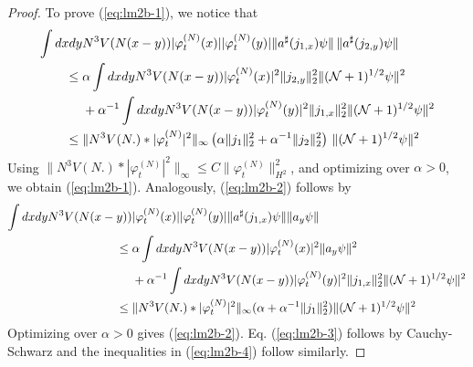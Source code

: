 \documentclass[11pt,a4paper,DIV11]{scrartcl}	%
\newcommand{\cN}{{\cal N}}
\begin{document}
\begin{proof}
To prove (\ref{eq:lm2b-1}), we notice that
\[ \begin{split} 
\int dx dy &N^3 V(N (x-y)) |\varphi_t^{(N)} (x)| |\varphi_t^{(N)} (y)|  \| a^\sharp (j_{1,x}) \psi \| \, \| a^\sharp (j_{2,y}) \psi \| \\ \leq \; & \alpha \int dx dy N^3 V(N (x-y)) |\varphi^{(N)}_t (x)|^2 \| j_{2,y} \|_2^2 \| (\cN+1)^{1/2} \psi \|^2 \\ &+ \alpha^{-1}
 \int dx dy N^3 V(N (x-y)) |\varphi^{(N)}_t (y)|^2 \| j_{1,x} \|_2^2 \| (\cN+1)^{1/2} \psi \|^2 \\
 \leq \; & \| N^3 V(N.) * |\varphi_t^{(N)}|^2 \|_\infty  \left( \alpha \| j_{1} \|^2_2 + \alpha^{-1}
 \| j_2 \|_{2}^2 \right) \, \| (\cN+1)^{1/2} \psi \|^2
 \end{split} \]
 Using $\| N^3 V(N.) * |\varphi_t^{(N)}|^2 \|_\infty \leq C \| \varphi_t^{(N)} \|_{H^2}^2$, and optimizing over $\alpha >0$, we obtain (\ref{eq:lm2b-1}). Analogously, (\ref{eq:lm2b-2}) follows by
\[ \begin{split} 
\int dx dy N^3 V(N (x-y)) &|\varphi^{(N)}_t (x)| |\varphi^{(N)}_t (y)| \| a^\sharp (j_{1,x}) \psi \| \| a_y \psi \| \\ 
\leq \; & \alpha \int dx dy N^3 V(N (x-y)) |\varphi^{(N)}_t (x)|^2 \| a_y \psi \|^2  \\ &+ \alpha^{-1}
 \int dx dy N^3 V(N (x-y)) |\varphi^{(N)}_t (y)|^2 \| j_{1,x} \|_2^2 \| (\cN+1)^{1/2} \psi \|^2 \\
 \leq \; & \| N^3 V(N.) * |\varphi_t^{(N)}|^2 \|_\infty (\alpha + \alpha^{-1} \| j_1\|_{2}^2) \| (\cN+1)^{1/2} \psi \|^2
 \end{split} \]
 Optimizing over $\alpha >0$ gives (\ref{eq:lm2b-2}). Eq. (\ref{eq:lm2b-3}) follows by Cauchy-Schwarz and the inequalities in (\ref{eq:lm2b-4}) follow similarly.
\end{proof} 
\end{document}
